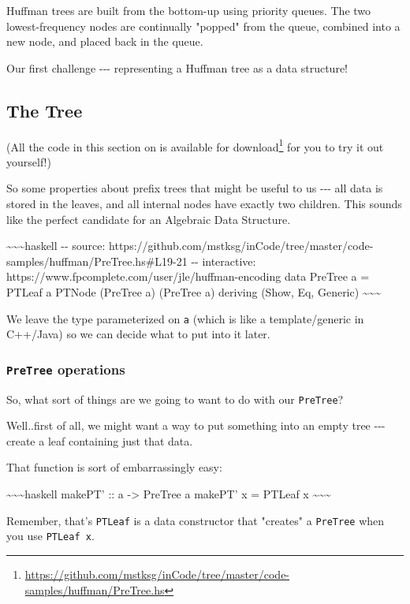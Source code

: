 \documentclass[]{article}
\renewcommand{\href}[2]{#2\footnote{\url{#1}}}
\begin{document}
Huffman trees are built from the bottom-up using priority queues. The two
lowest-frequency nodes are continually "popped" from the queue, combined into a
new node, and placed back in the queue.

Our first challenge -\/-\/- representing a Huffman tree as a data structure!

\subsection{The Tree}

(All the code in this section on is
\href{https://github.com/mstksg/inCode/tree/master/code-samples/huffman/PreTree.hs}{available
for download} for you to try it out yourself!)

So some properties about prefix trees that might be useful to us -\/-\/- all
data is stored in the leaves, and all internal nodes have exactly two children.
This sounds like the perfect candidate for an Algebraic Data Structure.

\textasciitilde{}\textasciitilde{}\textasciitilde{}haskell -\/- source:
https://github.com/mstksg/inCode/tree/master/code-samples/huffman/PreTree.hs\#L19-21
-\/- interactive: https://www.fpcomplete.com/user/jle/huffman-encoding data
PreTree a = PTLeaf a \textbar{} PTNode (PreTree a) (PreTree a) deriving (Show,
Eq, Generic) \textasciitilde{}\textasciitilde{}\textasciitilde{}

We leave the type parameterized on \texttt{a} (which is like a template/generic
in C++/Java) so we can decide what to put into it later.

\subsubsection{\texorpdfstring{\texttt{PreTree} operations}{PreTree operations}}

So, what sort of things are we going to want to do with our \texttt{PreTree}?

Well..first of all, we might want a way to put something into an empty tree
-\/-\/- create a leaf containing just that data.

That function is sort of embarrassingly easy:

\textasciitilde{}\textasciitilde{}\textasciitilde{}haskell makePT' :: a
-\textgreater{} PreTree a makePT' x = PTLeaf x
\textasciitilde{}\textasciitilde{}\textasciitilde{}

Remember, that's \texttt{PTLeaf} is a data constructor that "creates" a
\texttt{PreTree} when you use \texttt{PTLeaf\ x}.
\end{document}
